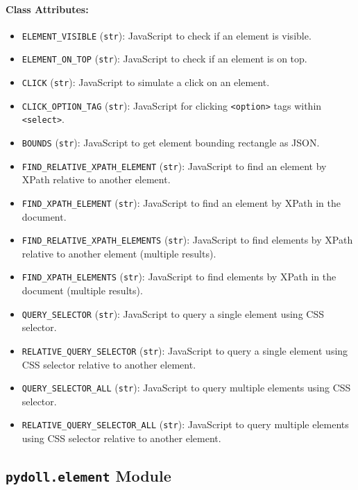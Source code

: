 \documentclass{article}
\begin{document}
\paragraph{Class Attributes:}
\begin{itemize}
    \item \texttt{ELEMENT\_VISIBLE} (\texttt{str}): JavaScript to check if an element is visible.
    \item \texttt{ELEMENT\_ON\_TOP} (\texttt{str}): JavaScript to check if an element is on top.
    \item \texttt{CLICK} (\texttt{str}): JavaScript to simulate a click on an element.
    \item \texttt{CLICK\_OPTION\_TAG} (\texttt{str}): JavaScript for clicking \texttt{<option>} tags within \texttt{<select>}.
    \item \texttt{BOUNDS} (\texttt{str}): JavaScript to get element bounding rectangle as JSON.
    \item \texttt{FIND\_RELATIVE\_XPATH\_ELEMENT} (\texttt{str}): JavaScript to find an element by XPath relative to another element.
    \item \texttt{FIND\_XPATH\_ELEMENT} (\texttt{str}): JavaScript to find an element by XPath in the document.
    \item \texttt{FIND\_RELATIVE\_XPATH\_ELEMENTS} (\texttt{str}): JavaScript to find elements by XPath relative to another element (multiple results).
    \item \texttt{FIND\_XPATH\_ELEMENTS} (\texttt{str}): JavaScript to find elements by XPath in the document (multiple results).
    \item \texttt{QUERY\_SELECTOR} (\texttt{str}): JavaScript to query a single element using CSS selector.
    \item \texttt{RELATIVE\_QUERY\_SELECTOR} (\texttt{str}): JavaScript to query a single element using CSS selector relative to another element.
    \item \texttt{QUERY\_SELECTOR\_ALL} (\texttt{str}): JavaScript to query multiple elements using CSS selector.
    \item \texttt{RELATIVE\_QUERY\_SELECTOR\_ALL} (\texttt{str}): JavaScript to query multiple elements using CSS selector relative to another element.
\end{itemize}

\hrulefill

\subsection*{\texttt{pydoll.element} Module}
\end{document}
